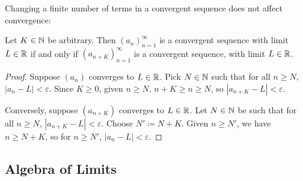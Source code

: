 \documentclass[../analysis1.tex]{subfiles}
\begin{document}
Changing a finite number of terms in a convergent sequence does not affect convergence:

\begin{lemma}
    \begin{shaded*}
        Let $K\in \mathbb{N}$ be arbitrary. Then $(a_n)_{n=1}^{\infty}$ is a convergent sequence with limit $L\in\mathbb{R}$ if and only if $(a_{n+K})_{n=1}^{\infty}$ is a convergent sequence, with limit $L\in\mathbb{R}$.
    \end{shaded*}
\end{lemma}
\begin{proof}
    Suppose $(a_n)$ converges to $L\in\mathbb{R}$. Pick $N\in \mathbb{N}$ such that for all $n\ge N$, $|a_n-L|<\varepsilon$. Since $K\ge 0$, given $n\ge N$, $n+K\ge n \ge N$, so $|a_{n+K}-L|<\varepsilon$.\par
    Conversely, suppose $(a_{n+K})$ converges to $L\in \mathbb{R}$. Let $N\in \mathbb{N}$ be such that for all $n\ge N$, $|a_{n+K}-L|<\varepsilon$. Choose $N'\coloneqq N+K$. Given $n\ge N'$, we have $n\ge N+K$, so for $n\ge N'$, $|a_n-L|<\varepsilon$.\qedhere
\end{proof}




\subsection{Algebra of Limits}
\end{document}
